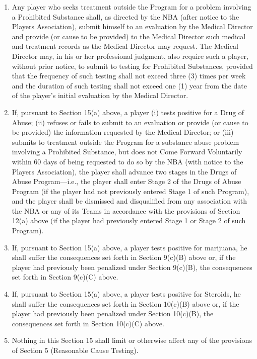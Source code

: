 \documentclass[
]{book}
\providecommand{\tightlist}{%
  \setlength{\itemsep}{0pt}\setlength{\parskip}{0pt}}
\begin{document}
\begin{enumerate}
\def\labelenumi{(\alph{enumi})}
\tightlist
\item
  Any player who seeks treatment outside the Program for a problem involving a Prohibited Substance shall, as directed by the NBA (after notice to the Players Association), submit himself to an evaluation by the Medical Director and provide (or cause to be provided) to the Medical Director such medical and treatment records as the Medical Director may request. The Medical Director may, in his or her professional judgment, also require such a player, without prior notice, to submit to testing for Prohibited Substances, provided that the frequency of such testing shall not exceed three (3) times per week and the duration of such testing shall not exceed one (1) year from the date of the player's initial evaluation by the Medical Director.
\item
  If, pursuant to Section 15(a) above, a player (i) tests positive for a Drug of Abuse; (ii) refuses or fails to submit to an evaluation or provide (or cause to be provided) the information requested by the Medical Director; or (iii) submits to treatment outside the Program for a substance abuse problem involving a Prohibited Substance, but does not Come Forward Voluntarily within 60 days of being requested to do so by the NBA (with notice to the Players Association), the player shall advance two stages in the Drugs of Abuse Program---i.e., the player shall enter Stage 2 of the Drugs of Abuse Program (if the player had not previously entered Stage 1 of such Program), and the player shall be dismissed and disqualified from any association with the NBA or any of its Teams in accordance with the provisions of Section 12(a) above (if the player had previously entered Stage 1 or Stage 2 of such Program).
\item
  If, pursuant to Section 15(a) above, a player tests positive for marijuana, he shall suffer the consequences set forth in Section 9(c)(B) above or, if the player had previously been penalized under Section 9(c)(B), the consequences set forth in Section 9(c)(C) above.
\item
  If, pursuant to Section 15(a) above, a player tests positive for Steroids, he shall suffer the consequences set forth in Section 10(c)(B) above or, if the player had previously been penalized under Section 10(c)(B), the consequences set forth in Section 10(c)(C) above.
\item
  Nothing in this Section 15 shall limit or otherwise affect any of the provisions of Section 5 (Reasonable Cause Testing).
\end{enumerate}
\end{document}

